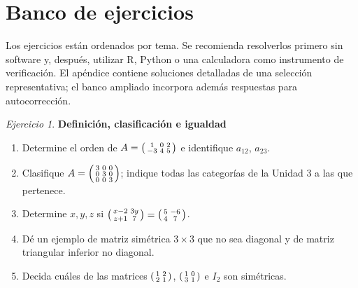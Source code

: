 \documentclass[12pt]{article}
\theoremstyle{remark}
\newtheorem{Ejer}[definicion]{Ejercicio}
\begin{document}
\section{Banco de ejercicios}
Los ejercicios están ordenados por tema. Se recomienda resolverlos primero sin software y, después, utilizar R, Python o una calculadora como instrumento de verificación. El apéndice contiene soluciones detalladas de una selección representativa; el banco ampliado incorpora además respuestas para autocorrección.

\begin{Ejer} \textbf{Definición, clasificación e igualdad}
\begin{enumerate}[series=banco]
\item Determine el orden de $A=\begin{psmallmatrix}1&0&2\\-3&4&5\end{psmallmatrix}$ e identifique $a_{12}$, $a_{23}$.
\item Clasifique $A=\begin{psmallmatrix}3&0&0\\0&3&0\\0&0&3\end{psmallmatrix}$; indique todas las categorías de la Unidad 3 a las que pertenece.
\item Determine $x,y,z$ si $\begin{psmallmatrix}x-2&3y\\z+1&7\end{psmallmatrix}=\begin{psmallmatrix}5&-6\\4&7\end{psmallmatrix}$.
\item Dé un ejemplo de matriz simétrica $3\times3$ que no sea diagonal y de matriz triangular inferior no diagonal.
\item Decida cuáles de las matrices $\begin{psmallmatrix}1&2\\2&1\end{psmallmatrix}$, $\begin{psmallmatrix}1&0\\3&1\end{psmallmatrix}$ e $I_2$ son simétricas.
\end{enumerate}
\end{Ejer}
\end{document}

